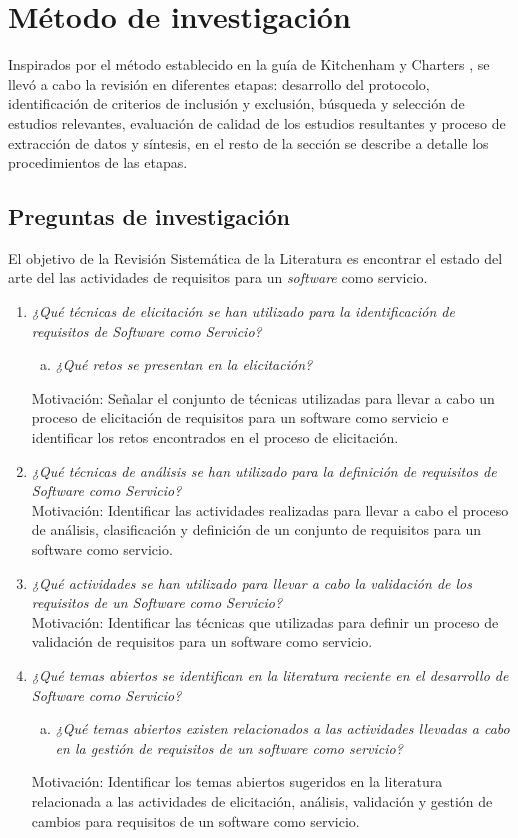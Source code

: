 \documentclass[conference,onecolumn,10pt]{IEEEtran}
\begin{document}
\section{Método de investigación}
Inspirados por el método establecido en la guía de Kitchenham y Charters \cite{kitchenham2007guidelines}, 
se llevó a cabo la revisión en diferentes etapas: desarrollo del protocolo, identificación de criterios de 
inclusión y exclusión, búsqueda y selección de estudios relevantes, evaluación de calidad de los estudios 
resultantes y proceso de extracción de datos y síntesis, en el resto de la sección se describe a 
detalle los procedimientos de las etapas. 

\subsection{Preguntas de investigación}
El objetivo de la Revisión Sistemática de la Literatura es encontrar el estado del arte del las actividades de requisitos para un \emph{software} como servicio. 

\begin{enumerate}[P 1.-]
  \item\emph{¿Qué técnicas de elicitación se han utilizado para la identificación de requisitos de Software como Servicio?}
  \begin{enumerate}[(a)]
  \item \emph{¿Qué retos se presentan en la elicitación?}
  \end{enumerate}
  Motivación: Señalar el conjunto de técnicas utilizadas para llevar a cabo un proceso de elicitación de requisitos para un software como servicio e identificar los retos encontrados en el proceso de elicitación. 
  
  \item\emph{¿Qué técnicas de análisis se han utilizado para la definición de requisitos de Software como Servicio?}\\
  Motivación: Identificar las actividades realizadas para llevar a cabo el proceso de análisis, clasificación y definición de un conjunto de requisitos para un software como servicio.

  \item\emph{¿Qué actividades se han utilizado para llevar a cabo la validación de los requisitos de un Software como Servicio?}\\
  Motivación: Identificar las técnicas que utilizadas para definir un proceso de validación de requisitos para un software como servicio.

  \item\emph{¿Qué temas abiertos se identifican en la literatura reciente en el desarrollo de Software como Servicio?}
  \begin{enumerate}[(a)]
  \item \emph{¿Qué temas abiertos existen relacionados a las actividades llevadas a cabo en la gestión de requisitos de un software como servicio?}
  \end{enumerate}
  Motivación: Identificar los temas abiertos sugeridos en la literatura relacionada a las actividades de elicitación, análisis, validación y gestión de cambios 
 para requisitos de un software como servicio.
\end{enumerate}
\end{document}
